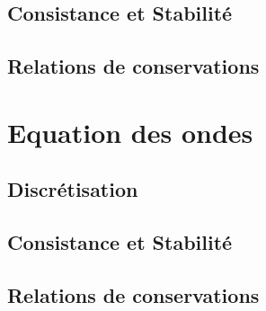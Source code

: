 \subsection{Consistance et Stabilité}

\subsection{Relations de conservations}




\section{Equation des ondes}

\subsection{Discrétisation}

\subsection{Consistance et Stabilité}

\subsection{Relations de conservations}